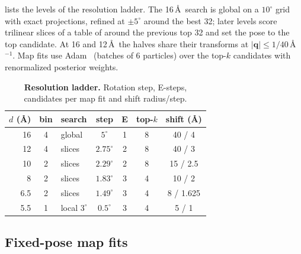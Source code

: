  lists the levels of the resolution ladder.
The 16\,\AA\ search is global on a $10^\circ$ grid with exact projections, refined at $\pm5^\circ$ around the best 32; later levels score trilinear slices of a table of  around the previous top 32 and set the pose to the top candidate.
At 16 and 12\,\AA\ the halves share their transforms at $|\mathbf{q}|\le1/40$\,\AA$^{-1}$.
Map fits use Adam~\cite{kingma2015adam} (batches of 6 particles) over the top-$k$ candidates with renormalized posterior weights.

\begin{table}[!htb]
\centering
\footnotesize
\caption{\textbf{Resolution ladder.} Rotation step, E-steps, candidates per map fit and shift radius/step.}
\label{tab:suppl:ladder}
\setlength{\tabcolsep}{3pt}
\begin{tabular}{@{}rclcccc@{}}
\toprule
$d$ (\AA) & bin & search & step & E & top-$k$ & shift (\AA) \\
\midrule
16  & 4 & global & $5^\circ$ & 1 & 8 & 40 / 4 \\
12  & 4 & slices & $2.75^\circ$ & 2 & 8 & 40 / 3 \\
10  & 2 & slices & $2.29^\circ$ & 2 & 8 & 15 / 2.5 \\
8   & 2 & slices & $1.83^\circ$ & 3 & 4 & 10 / 2 \\
6.5 & 2 & slices & $1.49^\circ$ & 3 & 4 & 8 / 1.625 \\
5.5 & 1 & local $3^\circ$ & $0.5^\circ$ & 3 & 4 & 5 / 1 \\
\bottomrule
\end{tabular}
\end{table}

\subsection{Fixed-pose map fits}
\label{sec:suppl:method:fit}


